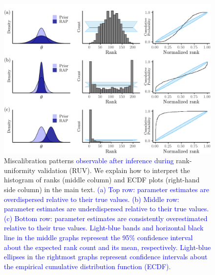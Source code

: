 \documentclass[oneside]{article}
\begin{document}
\begin{figure}
  \includegraphics[width=\linewidth]{../figures/sbc_conceptual_manual.pdf}
  \caption{
    Miscalibration patterns \textcolor{blue}{observable after inference} \textcolor{blue}{during} rank-uniformity validation (RUV).
    We explain how to interpret the histogram of ranks (middle column) and ECDF plots (right-hand side column) in the main text.
    \textcolor{blue}{
      (a) Top row: parameter estimates are overdispersed relative to their true values.
      (b) Middle row: parameter estimates are underdispersed relative to their true values.
      (c) Bottom row: parameter estimates are consistently overestimated relative to their true values.
      Light-blue bands and horizontal black line in the middle graphs represent the 95\% confidence interval about the expected rank count and its mean, respectively.
      Light-blue ellipses in the rightmost graphs represent confidence intervals about the empirical cumulative distribution function (ECDF).}
      }
  \label{fig:ruv_conceptual}
\end{figure}
\end{document}
